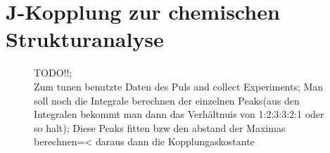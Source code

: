 \section{J-Kopplung zur chemischen Strukturanalyse}
\begin{figure}[H]
    \centering
    
    \caption{TODO!!;\\
    Zum tunen benutzte Daten des Puls and collect Experiments; Man soll noch die Integrale berechnen der einzelnen Peaks(aus den Integralen bekommt man dann das Verhältnuis von 1:2:3:3:2:1 oder so halt); Diese Peaks fitten bzw den abstand der Maximas berechnen=< daraus dann die Kopplungaskostante}
\end{figure}
